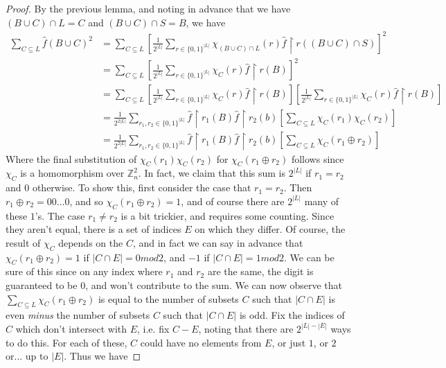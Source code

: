 \begin{proof}
By the previous lemma, and noting in advance that we have $(B \cup C) \cap L = C$ and $(B \cup C) \cap S = B$, we have
\begin{align}
	\sum_{C \subseteq L} \hat{f}(B \cup C)^2 &= \sum_{C \subseteq L} \left[ \frac{1}{2^{|L|}} \sum_{r \in \{0,1\}^{|L|}} \chi_{(B \cup C) \cap L}(r) \hat{f}\restriction r((B\cup C) \cap S) \right]^2 \\
	&= \sum_{C \subseteq L} \left[ \frac{1}{2^{|L|}} \sum_{r \in \{0,1\}^{|L|}} \chi_C(r) \hat{f}\restriction r(B) \right]^2 \\
	&= \sum_{C \subseteq L} \left[ \frac{1}{2^{|L|}} \sum_{r \in \{0,1\}^{|L|}} \chi_C(r) \hat{f}\restriction r(B) \right]\left[ \frac{1}{2^{|L|}} \sum_{r \in \{0,1\}^{|L|}} \chi_C(r) \hat{f}\restriction r(B) \right] \\
	&= \frac{1}{2^{2|L|}} \sum_{r_1,r_2 \in \{0,1\}^{|L|}} \hat{f}\restriction r_1(B) \hat{f}\restriction r_2(b) \left[ \sum_{C \subseteq L} \chi_C(r_1)\chi_C(r_2) \right] \\
	&= \frac{1}{2^{2|L|}} \sum_{r_1,r_2 \in \{0,1\}^{|L|}} \hat{f}\restriction r_1(B) \hat{f}\restriction r_2(b) \left[ \sum_{C \subseteq L} \chi_C(r_1 \oplus r_2) \right] 
\end{align}
Where the final substitution of $ \chi_C(r_1)\chi_C(r_2)$ for $\chi_C(r_1 \oplus r_2)$ follows since $\chi_C$ is a homomorphism over $\mathbb{Z}_n^2$. In fact, we claim that this sum is $2^{|L|}$ if $r_1 = r_2$ and $0$ otherwise. To show this, first consider the case that $r_1 = r_2$. Then $r_1 \oplus r_2 = 00\ldots0$, and so $\chi_C(r_1 \oplus r_2) = 1$, and of course there are $2^{|L|}$ many of these $1$'s. The case $r_1 \neq r_2$ is a bit trickier, and requires some counting. Since they aren't equal, there is a set of indices $E$ on which they differ. Of course, the result of $\chi_C$ depends on the $C$, and in fact we can say in advance that $\chi_C(r_1 \oplus r_2) = 1$ if $|C \cap E| = 0mod2$, and $-1$ if $|C \cap E| = 1mod2$. We can be sure of this since on any index where $r_1$ and $r_2$ are the same, the digit is guaranteed to be $0$, and won't contribute to the sum. We can now observe that $\sum_{C \subseteq L} \chi_C(r_1 \oplus r_2)$ is equal to the number of subsets $C$ such that $|C \cap E|$ is even \emph{minus} the number of subsets $C$ such that $|C \cap E|$ is odd. Fix the indices of $C$ which don't intersect with $E$, i.e. fix $C-E$, noting that there are $2^{|L|-|E|}$ ways to do this. For each of these, $C$ could have no elements from $E$, or just $1$, or $2$ or... up to $|E|$. Thus we have

\end{proof}
